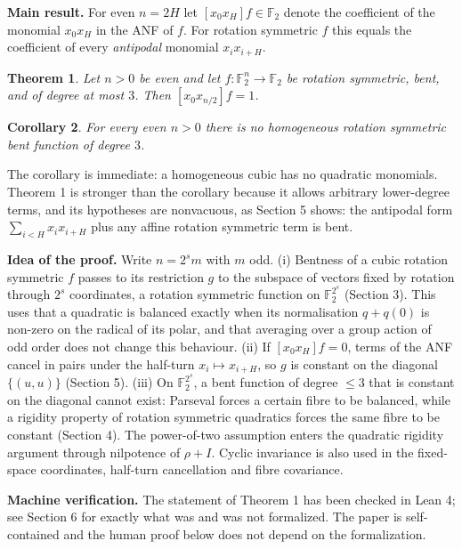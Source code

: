 \documentclass[11pt,reqno]{amsart}
\newtheorem{maintheorem}{Theorem}
\newtheorem{maincorollary}[maintheorem]{Corollary}
\begin{document}
\textbf{Main result.} For even $n=2H$ let $[x_0x_H]f\in\mathbb F_2$ denote the coefficient of the monomial $x_0x_H$ in the ANF of $f$. For rotation symmetric $f$ this equals the coefficient of every \emph{antipodal} monomial $x_ix_{i+H}$.

\begin{maintheorem}Let $n>0$ be even and let $f:\mathbb F_2^n\to\mathbb F_2$ be rotation symmetric, bent, and of degree at most $3$. Then $[x_0x_{n/2}]f=1$.\end{maintheorem}

\begin{maincorollary}For every even $n>0$ there is no homogeneous rotation symmetric bent function of degree $3$.\end{maincorollary}

The corollary is immediate: a homogeneous cubic has no quadratic monomials. Theorem 1 is stronger than the corollary because it allows arbitrary lower-degree terms, and its hypotheses are nonvacuous, as Section 5 shows: the antipodal form $\sum_{i<H}x_ix_{i+H}$ plus any affine rotation symmetric term is bent.

\textbf{Idea of the proof.} Write $n=2^s m$ with $m$ odd. (i) Bentness of a cubic rotation symmetric $f$ passes to its restriction $g$ to the subspace of vectors fixed by rotation through $2^s$ coordinates, a rotation symmetric function on $\mathbb F_2^{2^s}$ (Section 3). This uses that a quadratic is balanced exactly when its normalisation $q+q(0)$ is non-zero on the radical of its polar, and that averaging over a group action of odd order does not change this behaviour. (ii) If $[x_0x_H]f=0$, terms of the ANF cancel in pairs under the half-turn $x_i\mapsto x_{i+H}$, so $g$ is constant on the diagonal $\{(u,u)\}$ (Section 5). (iii) On $\mathbb F_2^{2^s}$, a bent function of degree $\le 3$ that is constant on the diagonal cannot exist: Parseval forces a certain fibre to be balanced, while a rigidity property of rotation symmetric quadratics forces the same fibre to be constant (Section 4). The power-of-two assumption enters the quadratic rigidity argument through nilpotence of $\rho+I$. Cyclic invariance is also used in the fixed-space coordinates, half-turn cancellation and fibre covariance.

\textbf{Machine verification.} The statement of Theorem 1 has been checked in Lean 4; see Section 6 for exactly what was and was not formalized. The paper is self-contained and the human proof below does not depend on the formalization.
\end{document}
